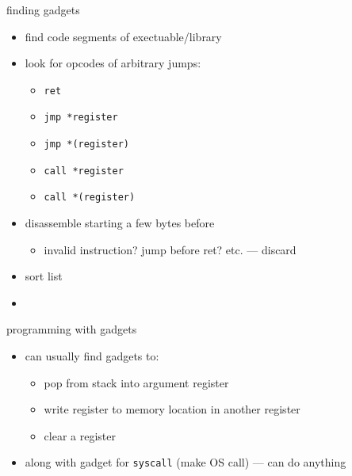 \begin{frame}{finding gadgets}
    \begin{itemize}
        \item find code segments of exectuable/library
        \item look for opcodes of arbitrary jumps:
            \begin{itemize}
            \item \texttt{ret}
            \item \texttt{jmp *register}
            \item \texttt{jmp *(register)}
            \item \texttt{call *register}
            \item \texttt{call *(register)}
        \end{itemize}
        \item disassemble starting a few bytes before
            \begin{itemize}
            \item invalid instruction? jump before ret? etc. --- discard
            \end{itemize}
        \item sort list
        \vspace{.5cm}
    \item {}
    \end{itemize}
\end{frame}

\begin{frame}{programming with gadgets}
    \begin{itemize}
        \item can usually find gadgets to:
            \begin{itemize}
            \item pop from stack into argument register
            \item write register to memory location in another register
            \item clear a register
            \end{itemize}
        \item along with gadget for \texttt{syscall} (make OS call) --- can do anything
    \end{itemize}
\end{frame}

